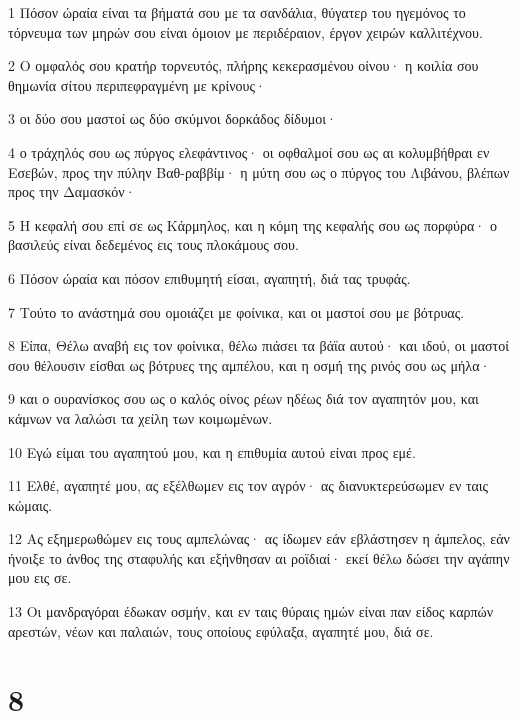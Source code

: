 \par 1 Πόσον ώραία είναι τα βήματά σου με τα σανδάλια, θύγατερ του ηγεμόνος το τόρνευμα των μηρών σου είναι όμοιον με περιδέραιον, έργον χειρών καλλιτέχνου.
\par 2 Ο ομφαλός σου κρατήρ τορνευτός, πλήρης κεκερασμένου οίνου· η κοιλία σου θημωνία σίτου περιπεφραγμένη με κρίνους·
\par 3 οι δύο σου μαστοί ως δύο σκύμνοι δορκάδος δίδυμοι·
\par 4 ο τράχηλός σου ως πύργος ελεφάντινος· οι οφθαλμοί σου ως αι κολυμβήθραι εν Εσεβών, προς την πύλην Βαθ-ραββίμ· η μύτη σου ως ο πύργος του Λιβάνου, βλέπων προς την Δαμασκόν·
\par 5 Η κεφαλή σου επί σε ως Κάρμηλος, και η κόμη της κεφαλής σου ως πορφύρα· ο βασιλεύς είναι δεδεμένος εις τους πλοκάμους σου.
\par 6 Πόσον ώραία και πόσον επιθυμητή είσαι, αγαπητή, διά τας τρυφάς.
\par 7 Τούτο το ανάστημά σου ομοιάζει με φοίνικα, και οι μαστοί σου με βότρυας.
\par 8 Είπα, Θέλω αναβή εις τον φοίνικα, θέλω πιάσει τα βάϊα αυτού· και ιδού, οι μαστοί σου θέλουσιν είσθαι ως βότρυες της αμπέλου, και η οσμή της ρινός σου ως μήλα·
\par 9 και ο ουρανίσκος σου ως ο καλός οίνος ρέων ηδέως διά τον αγαπητόν μου, και κάμνων να λαλώσι τα χείλη των κοιμωμένων.
\par 10 Εγώ είμαι του αγαπητού μου, και η επιθυμία αυτού είναι προς εμέ.
\par 11 Ελθέ, αγαπητέ μου, ας εξέλθωμεν εις τον αγρόν· ας διανυκτερεύσωμεν εν ταις κώμαις.
\par 12 Ας εξημερωθώμεν εις τους αμπελώνας· ας ίδωμεν εάν εβλάστησεν η άμπελος, εάν ήνοιξε το άνθος της σταφυλής και εξήνθησαν αι ροϊδιαί· εκεί θέλω δώσει την αγάπην μου εις σε.
\par 13 Οι μανδραγόραι έδωκαν οσμήν, και εν ταις θύραις ημών είναι παν είδος καρπών αρεστών, νέων και παλαιών, τους οποίους εφύλαξα, αγαπητέ μου, διά σε.

\chapter{8}

